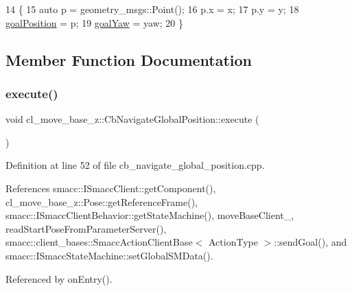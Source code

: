 \begin{DoxyCode}
14     \{
15         \textcolor{keyword}{auto} p = geometry\_msgs::Point();
16         p.x = x;
17         p.y = y;
18         \hyperlink{classcl__move__base__z_1_1CbNavigateGlobalPosition_a51a0266fd9a63e99f26e88933529c559}{goalPosition} = p;
19         \hyperlink{classcl__move__base__z_1_1CbNavigateGlobalPosition_a839900de7f664b27c9be189fadbaa003}{goalYaw} = yaw;
20     \}
\end{DoxyCode}


\subsection{Member Function Documentation}
\mbox{\label{classcl__move__base__z_1_1CbNavigateGlobalPosition_a0b8525ea9e4388b27cb1f9b1e06a3b63}} 
\subsubsection{\texorpdfstring{execute()}{execute()}}
{\footnotesize\ttfamily void cl\+\_\+move\+\_\+base\+\_\+z\+::\+Cb\+Navigate\+Global\+Position\+::execute (\begin{DoxyParamCaption}{ }\end{DoxyParamCaption})}



Definition at line 52 of file cb\+\_\+navigate\+\_\+global\+\_\+position.\+cpp.



References smacc\+::\+I\+Smacc\+Client\+::get\+Component(), cl\+\_\+move\+\_\+base\+\_\+z\+::\+Pose\+::get\+Reference\+Frame(), smacc\+::\+I\+Smacc\+Client\+Behavior\+::get\+State\+Machine(), move\+Base\+Client\+\_\+, read\+Start\+Pose\+From\+Parameter\+Server(), smacc\+::client\+\_\+bases\+::\+Smacc\+Action\+Client\+Base$<$ Action\+Type $>$\+::send\+Goal(), and smacc\+::\+I\+Smacc\+State\+Machine\+::set\+Global\+S\+M\+Data().



Referenced by on\+Entry().


